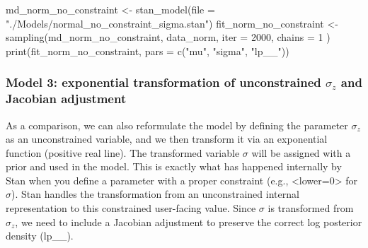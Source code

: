 \documentclass[
  letterpaper,
  DIV=11,
  numbers=noendperiod]{scrartcl}
\newenvironment{Shaded}{}{}
\newcommand{\AttributeTok}[1]{\textcolor[rgb]{0.65,0.15,0.64}{#1}}
\newcommand{\DecValTok}[1]{\textcolor[rgb]{0.60,0.41,0.00}{#1}}
\newcommand{\FunctionTok}[1]{\textcolor[rgb]{0.25,0.47,0.95}{#1}}
\newcommand{\NormalTok}[1]{\textcolor[rgb]{0.22,0.23,0.26}{#1}}
\newcommand{\OtherTok}[1]{\textcolor[rgb]{0.15,0.68,0.38}{#1}}
\newcommand{\StringTok}[1]{\textcolor[rgb]{0.31,0.63,0.31}{#1}}
\begin{document}
\begin{Shaded}
\begin{Highlighting}[]
\NormalTok{md\_norm\_no\_constraint }\OtherTok{\textless{}{-}} \FunctionTok{stan\_model}\NormalTok{(}\AttributeTok{file =} \StringTok{"./Models/normal\_no\_constraint\_sigma.stan"}\NormalTok{)}
\NormalTok{fit\_norm\_no\_constraint }\OtherTok{\textless{}{-}} \FunctionTok{sampling}\NormalTok{(md\_norm\_no\_constraint, data\_norm,}
  \AttributeTok{iter =} \DecValTok{2000}\NormalTok{, }\AttributeTok{chains =} \DecValTok{1}
\NormalTok{)}
\FunctionTok{print}\NormalTok{(fit\_norm\_no\_constraint, }\AttributeTok{pars =} \FunctionTok{c}\NormalTok{(}\StringTok{"mu"}\NormalTok{, }\StringTok{"sigma"}\NormalTok{, }\StringTok{"lp\_\_"}\NormalTok{))}
\end{Highlighting}
\end{Shaded}

\subsubsection{\texorpdfstring{Model 3: exponential transformation of
unconstrained \(\sigma_z\) and Jacobian
adjustment}{Model 3: exponential transformation of unconstrained \textbackslash sigma\_z and Jacobian adjustment}}\label{model-3-exponential-transformation-of-unconstrained-sigma_z-and-jacobian-adjustment}

As a comparison, we can also reformulate the model by defining the
parameter \(\sigma_z\) as an unconstrained variable, and we then
transform it via an exponential function (positive real line). The
transformed variable \(\sigma\) will be assigned with a prior and used
in the model. This is exactly what has happened internally by Stan when
you define a parameter with a proper constraint (e.g.,
\textless lower=0\textgreater{} for \(\sigma\)). Stan handles the
transformation from an unconstrained internal representation to this
constrained user-facing value. Since \(\sigma\) is transformed from
\(\sigma_z\), we need to include a Jacobian adjustment to preserve the
correct log posterior density (lp\_\_).
\end{document}
